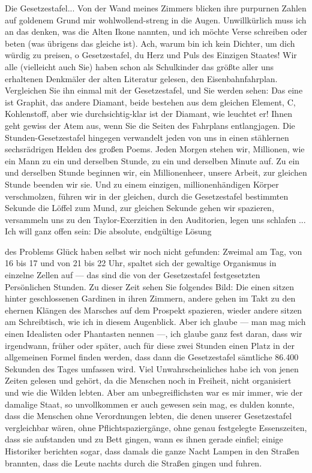Die Gesetzestafel... Von der Wand meines Zimmers blicken ihre
purpurnen Zahlen auf goldenem Grund mir wohlwollend-streng in die
Augen. Unwillkürlich muss ich an das denken, was die Alten Ikone
nannten, und ich möchte Verse schreiben oder beten (was übrigens
das gleiche ist). Ach, warum bin ich kein Dichter, um dich würdig
zu preisen, o Gesetzestafel, du Herz und Puls des Einzigen Staates!
Wir alle (vielleicht auch Sie) haben schon als Schulkinder das
größte aller uns erhaltenen Denkmäler der alten Literatur gelesen,
den Eisenbahnfahrplan. Vergleichen Sie ihn einmal mit der
Gesetzestafel, und Sie werden sehen: Das eine ist Graphit, das
andere Diamant, beide bestehen aus dem gleichen Element, C,
Kohlenstoff, aber wie durchsichtig-klar ist der Diamant, wie
leuchtet er! Ihnen geht gewiss der Atem aus, wenn Sie die Seiten
des Fahrplans entlangjagen. Die Stunden-Gesetzestafel hingegen
verwandelt jeden von uns in einen stählernen sechsrädrigen Helden
des großen Poems. Jeden Morgen stehen wir, Millionen, wie ein Mann
zu ein und derselben Stunde, zu ein und derselben Minute auf. Zu
ein und derselben Stunde beginnen wir, ein Millionenheer, unsere
Arbeit, zur gleichen Stunde beenden wir sie. Und zu einem einzigen,
millionenhändigen Körper verschmolzen, führen wir in der gleichen,
durch die Gesetzestafel bestimmten Sekunde die Löffel zum Mund, zur
gleichen Sekunde gehen wir spazieren, versammeln uns zu den
Taylor-Exerzitien in den Auditorien, legen uns schlafen ... Ich
will ganz offen sein: Die absolute, endgültige Lösung

des Problems Glück haben selbst wir noch nicht gefunden: Zweimal am
Tag, von 16 bis 17 und von 21 bis 22 Uhr, spaltet sich der
gewaltige Organismus in einzelne Zellen auf — das sind die von der
Gesetzestafel festgesetzten Persönlichen Stunden. Zu dieser Zeit
sehen Sie folgendes Bild: Die einen sitzen hinter geschlossenen
Gardinen in ihren Zimmern, andere gehen im Takt zu den ehernen
Klängen des Marsches auf dem Prospekt spazieren, wieder andere
sitzen am Schreibtisch, wie ich in diesem Augenblick. Aber ich
glaube — man mag mich einen Idealisten oder Phantasten nennen —,
ich glaube ganz fest daran, dass wir irgendwann, früher oder
später, auch für diese zwei Stunden einen Platz in der allgemeinen
Formel finden werden, dass dann die Gesetzestafel sämtliche 86.400
Sekunden des Tages umfassen wird. Viel Unwahrscheinliches habe ich
von jenen Zeiten gelesen und gehört, da die Menschen noch in
Freiheit, nicht organisiert und wie die Wilden lebten. Aber am
unbegreiflichsten war es mir immer, wie der damalige Staat, so
unvollkommen er auch gewesen sein mag, es dulden konnte, dass die
Menschen ohne Verordnungen lebten, die denen unserer Gesetzestafel
vergleichbar wären, ohne Pflichtspaziergänge, ohne genau
festgelegte Essenszeiten, dass sie aufstanden und zu Bett gingen,
wann es ihnen gerade einfiel; einige Historiker berichten sogar,
dass damals die ganze Nacht Lampen in den Straßen brannten, dass
die Leute nachts durch die Straßen gingen und fuhren.

